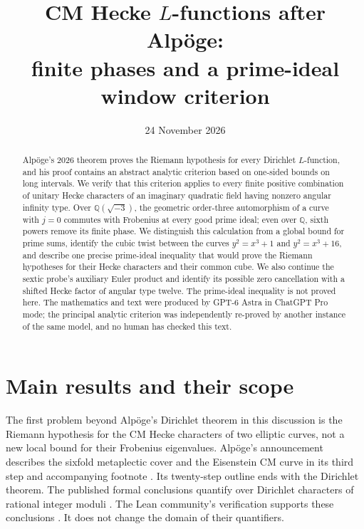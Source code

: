 \documentclass[11pt]{article}
\title{CM Hecke $L$-functions after Alp\"oge:\\finite phases and a prime-ideal window criterion}
\author{}
\date{24 November 2026}
\newcommand{\Q}{\mathbb Q}
\theoremstyle{definition}
\theoremstyle{remark}
\begin{document}
\maketitle
\begin{abstract}
Alp\"oge's 2026 theorem proves the Riemann hypothesis for every Dirichlet
$L$-function, and his proof contains an abstract analytic criterion based on
one-sided bounds on long intervals.  We verify that this criterion applies
to every finite positive combination of unitary Hecke characters of an
imaginary quadratic field having nonzero angular infinity type.  Over
$\Q(\sqrt{-3})$, the geometric order-three automorphism of a curve with
$j=0$ commutes with Frobenius at every good prime ideal; even over $\Q$,
sixth powers remove its finite phase.  We distinguish this calculation from
a global bound for prime sums, identify the cubic twist between the curves
$y^2=x^3+1$ and $y^2=x^3+16$, and describe one precise prime-ideal inequality
that would prove the Riemann hypotheses for their Hecke characters and
their common cube.  We also continue the sextic probe's auxiliary Euler
product and identify its possible zero cancellation with a shifted Hecke
factor of angular type twelve.  The prime-ideal inequality is not proved
here.  The mathematics
and text were produced by GPT-6 Astra in ChatGPT Pro mode; the principal
analytic criterion was independently re-proved by another instance of the
same model, and no human has checked this text.
\end{abstract}

\section{Main results and their scope}

The first problem beyond Alp\"oge's Dirichlet theorem in this discussion is
the Riemann hypothesis for the CM Hecke characters of two elliptic curves,
not a new local bound for their Frobenius eigenvalues.  Alp\"oge's announcement
describes the sixfold metaplectic cover and the Eisenstein CM curve in its
third step and accompanying footnote \cite[p.~3, step~3 and footnote~3]{Alpoge}.
Its twenty-step outline ends with the Dirichlet theorem.  The published
formal conclusions quantify over Dirichlet characters of rational integer
moduli \cite[\texttt{DirichletLNonvanishingRightOfHalf}]{AlpogeCode}.
The Lean community's verification supports these conclusions
\cite{LeanCommunity,MITVerification}.  It does not change the domain of
their quantifiers.
\end{document}
